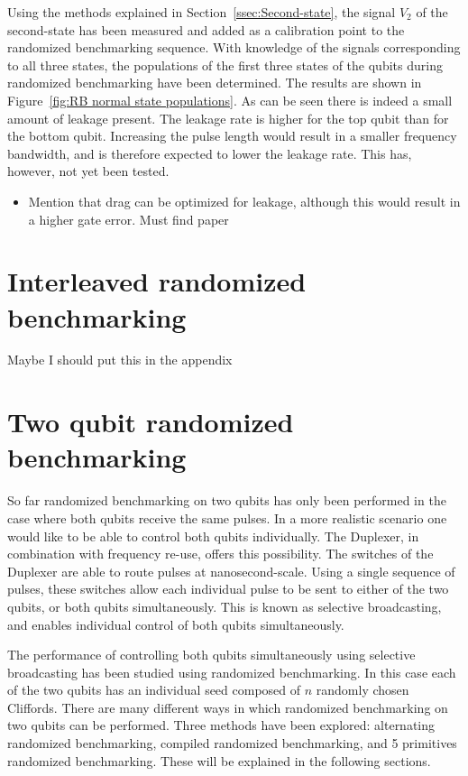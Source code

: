         Using the methods explained in Section~\ref{ssec:Second-state}, the signal $V_2$ of the second-state has been measured and added as a calibration point to the randomized benchmarking sequence. With knowledge of the signals corresponding to all three states, the populations of the first three states of the qubits during randomized benchmarking have been determined. The results are shown in Figure~\ref{fig:RB normal state populations}. As can be seen there is indeed a small amount of leakage present. The leakage rate is higher for the top qubit than for the bottom qubit. Increasing the pulse length would result in a smaller frequency bandwidth, and is therefore expected to lower the leakage rate. This has, however, not yet been tested.

        \begin{itemize}
          \item Mention that drag can be optimized for leakage, although this would result in a higher gate error. Must find paper
        \end{itemize}

    \section{Interleaved randomized benchmarking}
      \label{sec:interleaved randomized benchmarking}
      Maybe I should put this in the appendix

    \section{Two qubit randomized benchmarking}
      \label{Two qubit randomized benchmarking}
      So far randomized benchmarking on two qubits has only been performed in the case where both qubits receive the same pulses. In a more realistic scenario one would like to be able to control both qubits individually. The Duplexer, in combination with frequency re-use, offers this possibility. The switches of the Duplexer are able to route pulses at nanosecond-scale. Using a single sequence of pulses, these switches allow each individual pulse to be sent to either of the two qubits, or both qubits simultaneously. This is known as selective broadcasting, and enables individual control of both qubits simultaneously.

      The performance of controlling both qubits simultaneously using selective broadcasting has been studied using randomized benchmarking. In this case each of the two qubits has an individual seed composed of $n$ randomly chosen Cliffords. There are many different ways in which randomized benchmarking on two qubits can be performed. Three methods have been explored: alternating randomized benchmarking, compiled randomized benchmarking, and 5 primitives randomized benchmarking. These will be explained in the following sections.

